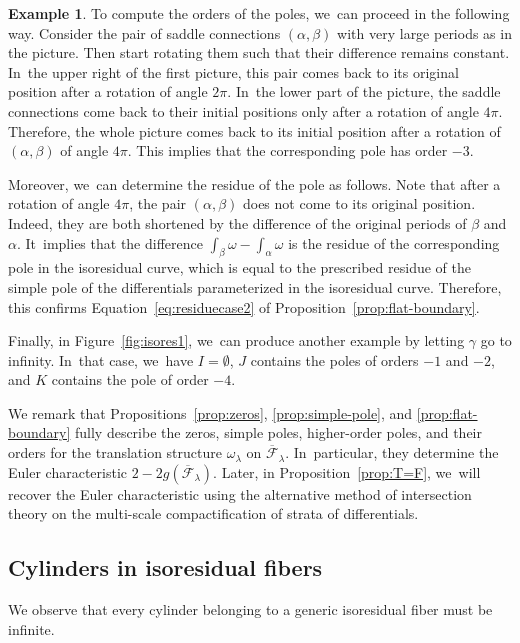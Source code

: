 \documentclass[11pt]{article}
\theoremstyle{definition}
\newtheorem{ex}[thm]{Example}
\begin{document}
\begin{ex}
To compute the orders of the poles, we~can proceed in the following way. Consider the pair of saddle connections $(\alpha,\beta)$ with very large periods as in the picture. Then start rotating them such that their difference remains constant. In~the upper right of the first picture, this pair comes back to its original position after a rotation of angle $2\pi$. In~the lower part of the picture, the saddle connections come back to their initial positions only after a rotation of angle $4\pi$. Therefore, the whole picture comes back to its initial position after a rotation of $(\alpha,\beta)$ of angle $4\pi$. This implies that the corresponding pole has order $-3$.

Moreover, we~can determine the residue of the pole as follows. Note that after a rotation of angle $4\pi$, the pair $(\alpha,\beta)$ does not come to its original position. Indeed, they are both shortened by the difference of the original periods of $\beta$ and $\alpha$. It~implies that the difference $\int_{\beta}\omega -\int_{\alpha}\omega$
is the residue of the corresponding pole in the isoresidual curve, which is equal to the prescribed residue of the simple pole of the differentials parameterized in the isoresidual curve. Therefore, this confirms Equation~\eqref{eq:residuecase2} of Proposition~\ref{prop:flat-boundary}.

Finally, in Figure~\ref{fig:isores1}, we~can produce another example by letting $\gamma$ go to infinity. In~that case, we~have $I=\emptyset$, $J$ contains the poles of orders $-1$ and $-2$, and $K$ contains the pole of order $-4$.
\end{ex}

We remark that Propositions~\ref{prop:zeros}, \ref{prop:simple-pole}, and \ref{prop:flat-boundary} fully describe the zeros, simple poles, higher-order poles, and their orders for the translation structure $\omega_\lambda$ on $\overline{\mathcal{F}}_{\lambda}$. In~particular, they determine the Euler characteristic $2-2g(\overline{\mathcal{F}}_{\lambda})$. Later, in Proposition~\ref{prop:T=F}, we~will recover the Euler characteristic using the alternative method of intersection theory on the multi-scale compactification of strata of differentials.

\subsection{Cylinders in isoresidual fibers}\label{sub:cylinders}

We observe that every cylinder belonging to a generic isoresidual fiber must be infinite.
\end{document}
